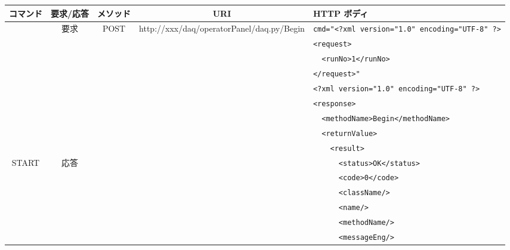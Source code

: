\documentclass[a4j,10pt,dvips,onecolumn,oneside,final]{jarticle}%
\begin{document}
\begin{table}[htbp]
\begin{center}
{\scriptsize
    \begin{tabular}{|c|c|c|c|l|}\hline
      コマンド    & 要求/応答 & メソッド & URI                      & HTTP ボディ\\ \hline
                  & 要求      & POST & http://xxx/daq/operatorPanel/daq.py/Begin  & \verb|cmd="<?xml version="1.0" encoding="UTF-8" ?>|\\
                  &           &      &                                            & \verb|<request>|\\ 
                  &           &      &                                            & \verb|  <runNo>1</runNo>|\\
                  &           &      &                                            & \verb|</request>"|\\ \cline{2-5}
                  &           &      &                                            & \verb|<?xml version="1.0" encoding="UTF-8" ?>|\\ 
                  &           &      &                                            & \verb|<response>|\\ 
                  &           &      &                                            & \verb|  <methodName>Begin</methodName>|\\ 
                  &           &      &                                            & \verb|  <returnValue>|\\ 
                  &           &      &                                            & \verb|    <result>|\\ 
      START       & 応答      &      &                                            & \verb|      <status>OK</status>|\\ 
                  &           &      &                                            & \verb|      <code>0</code>|\\ 
                  &           &      &                                            & \verb|      <className/>|\\ 
                  &           &      &                                            & \verb|      <name/>|\\ 
                  &           &      &                                            & \verb|      <methodName/>|\\ 
                  &           &      &                                            & \verb|      <messageEng/>|\\ 

\end{tabular}}
\end{center}
\end{table}
\end{document}
